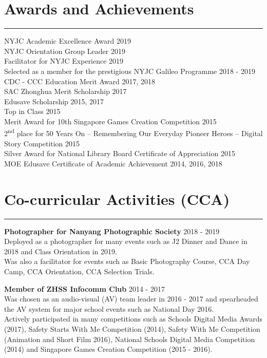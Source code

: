 \documentclass[letterpaper,11pt]{article}
\begin{document}
    \section{Awards and Achievements}
    \vspace{-0.5em}
    \hrule
    \vspace{0.5em}
    NYJC Academic Excellence Award \hfill 2019
    \\
    NYJC Orientation Group Leader \hfill 2019
    \\
    Facilitator for NYJC Experience \hfill 2019
    \\
    Selected as a member for the prestigious NYJC Galileo Programme \hfill 2018 - 2019
    \\
    CDC - CCC Education Merit Award \hfill 2017, 2018
    \\
    SAC Zhonghua Merit Scholarship \hfill 2017
    \\
    Edusave Scholarship \hfill 2015, 2017
    \\
    Top in Class \hfill 2015
    \\
    Merit Award for 10th Singapore Games Creation Competition \hfill 2015
    \\
    2\textsuperscript{nd} place for 50 Years On – Remembering Our Everyday Pioneer Heroes – Digital 
    Story Competition \hfill 2015
    \\
    Silver Award for National Library Board Certificate of Appreciation \hfill 2015
    \\
    MOE Edusave Certificate of Academic Achievement \hfill 2014, 2016, 2018

    \section{Co-curricular Activities (CCA)}
    \vspace{-0.5em}
    \hrule
    \vspace{0.5em}
    \textbf{Photographer for Nanyang Photographic Society} \hfill 2018 - 2019
    \\
    Deployed as a photographer for many events such as J2 Dinner and Dance in 2018 and Class 
    Orientation in 2019.
    \\
    Was also a facilitator for events such as Basic Photography Course, CCA Day Camp, 
    CCA Orientation, CCA Selection Trials.

    \vspace{0.5em}
    \textbf{Member of ZHSS Infocomm Club} \hfill 2014 - 2017
    \\
    Was chosen as an audio-visual (AV) team leader in 2016 - 2017 and spearheaded the AV system for 
    major school events such as National Day 2016.
    \\
    Actively participated in many competitions such as Schools Digital Media Awards (2017), 
    Safety Starts With Me Competition (2014), Safety With Me Competition (Animation and Short Film 
    2016), National Schools Digital Media Competition (2014) and Singapore Games Creation 
    Competition (2015 - 2016).
\end{document}
